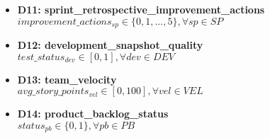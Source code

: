 \documentclass{article}
\begin{document}
\begin{itemize}
    \item \textbf{D11: sprint\_retrospective\_improvement\_actions} \\
    $improvement\_actions_{sp} \in \{0, 1, ..., 5\}, \forall sp \in SP$

    \item \textbf{D12: development\_snapshot\_quality} \\
    $test\_status_{dev} \in [0, 1], \forall dev \in DEV$

    \item \textbf{D13: team\_velocity} \\
    $avg\_story\_points_{vel} \in [0, 100], \forall vel \in VEL$

    \item \textbf{D14: product\_backlog\_status} \\
    $status_{pb} \in \{0, 1\}, \forall pb \in PB$
\end{itemize}
\end{document}

